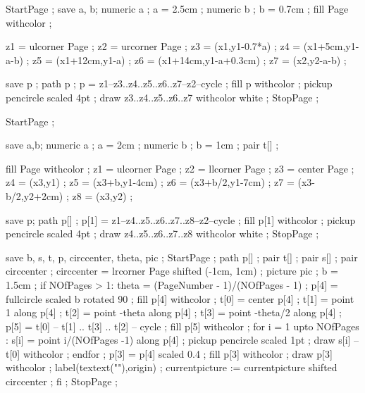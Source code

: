 \setupcolors[textcolor=simpleslides:textcolor]


StartPage ;
save a, b;
numeric a ; a = 2.5cm ;
numeric b ; b = 0.7cm ;
fill Page withcolor  ;

z1 = ulcorner Page ;
z2 = urcorner Page ;
z3 = (x1,y1-0.7*a) ;
z4 = (x1+5cm,y1-a-b) ;
z5 = (x1+12cm,y1-a) ;
z6 = (x1+14cm,y1-a+0.3cm) ;
z7 = (x2,y2-a-b) ;

save p ;
path p ;
p = z1--z3..z4..z5..z6..z7--z2--cycle ;
fill p withcolor  ;
pickup pencircle scaled 4pt ;
draw z3..z4..z5..z6..z7 withcolor white ;
StopPage ;
\stopuniqueMPgraphic 

StartPage ;

save a,b;
numeric a ; a = 2cm ;
numeric b ; b = 1cm ;
pair  t[] ;

fill Page withcolor  ;
z1 = ulcorner Page ;
z2 = llcorner Page ;
z3 = center Page ;
z4 = (x3,y1) ;
z5 = (x3+b,y1-4cm) ;
z6 = (x3+b/2,y1-7cm) ;
z7 = (x3-b/2,y2+2cm) ;
z8 = (x3,y2) ;

save p;
path p[] ;
p[1] = z1--z4..z5..z6..z7..z8--z2--cycle ;
fill p[1] withcolor  ;
pickup pencircle scaled 4pt ;
draw z4..z5..z6..z7..z8 withcolor white ;
StopPage ;
\stopuniqueMPgraphic 

save b, s, t, p, circcenter, theta, pic ;
StartPage ;
path p[] ;
pair t[] ;
pair s[] ;
pair circcenter ; circcenter = lrcorner Page shifted (-1cm, 1cm) ;
picture pic ;
b = 1.5cm ;
if NOfPages > 1:
	theta = (PageNumber - 1)/(NOfPages - 1) ;
	p[4] = fullcircle scaled b rotated 90 ;
	fill p[4] withcolor   ;
	t[0] = center p[4] ;
	t[1] = point 1 along p[4] ;
	t[2] = point -theta along p[4] ;
	t[3] = point -theta/2 along p[4] ;
	p[5] = t[0] -- t[1] .. t[3] .. t[2] -- cycle ;
	fill p[5] withcolor  ;
	for i = 1 upto NOfPages :
		s[i] = point i/(NOfPages -1) along p[4] ;
		pickup pencircle scaled 1pt ;
		draw s[i] -- t[0] withcolor  ;
	endfor ;
	p[3] = p[4] scaled 0.4 ;
	fill p[3] withcolor  ;
	draw p[3] withcolor  ;
	label(textext("\switchtobodyfont[10pt]\pagenumber"),origin) ;
	currentpicture := currentpicture shifted circcenter ;
fi ;
StopPage ;
\stopuseMPgraphic 

